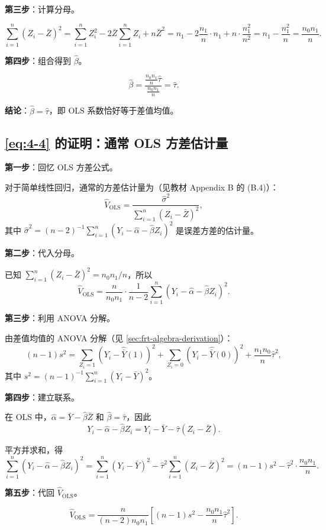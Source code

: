 \textbf{第三步}：计算分母。

\[
\sum_{i=1}^n (Z_i - \bar{Z})^2 = \sum_{i=1}^n Z_i^2 - 2\bar{Z}\sum_{i=1}^n Z_i + n\bar{Z}^2 = n_1 - 2\frac{n_1}{n}\cdot n_1 + n\cdot\frac{n_1^2}{n^2} = n_1 - \frac{n_1^2}{n} = \frac{n_0 n_1}{n}.
\]

\textbf{第四步}：组合得到 $\hat{\beta}$。

\[
\hat{\beta} = \frac{\frac{n_0 n_1}{n}\hat{\tau}}{\frac{n_0 n_1}{n}} = \hat{\tau}.
\]

\textbf{结论}：$\hat{\beta} = \hat{\tau}$，即 OLS 系数恰好等于差值均值。

\subsection*{\eqref{eq:4-4} 的证明：通常 OLS 方差估计量}

\textbf{第一步}：回忆 OLS 方差公式。

对于简单线性回归，通常的方差估计量为（见教材 Appendix B 的 (B.4)）：
\[
\hat{V}_{\text{OLS}} = \frac{\hat{\sigma}^2}{\sum_{i=1}^n (Z_i - \bar{Z})^2},
\]
其中 $\hat{\sigma}^2 = (n-2)^{-1}\sum_{i=1}^n (Y_i - \hat{\alpha} - \hat{\beta} Z_i)^2$ 是误差方差的估计量。

\textbf{第二步}：代入分母。

已知 $\sum_{i=1}^n (Z_i - \bar{Z})^2 = n_0 n_1/n$，所以
\[
\hat{V}_{\text{OLS}} = \frac{n}{n_0 n_1}\cdot\frac{1}{n-2}\sum_{i=1}^n (Y_i - \hat{\alpha} - \hat{\beta} Z_i)^2.
\]

\textbf{第三步}：利用 ANOVA 分解。

由差值均值的 ANOVA 分解（见 \cref{sec:frt-algebra-derivation}）：
\[
(n-1)s^2 = \sum_{Z_i=1}(Y_i - \hat{\bar{Y}}(1))^2 + \sum_{Z_i=0}(Y_i - \hat{\bar{Y}}(0))^2 + \frac{n_1 n_0}{n}\hat{\tau}^2,
\]
其中 $s^2 = (n-1)^{-1}\sum_{i=1}^n(Y_i - \bar{Y})^2$。

\textbf{第四步}：建立联系。

在 OLS 中，$\hat{\alpha} = \bar{Y} - \hat{\beta}\bar{Z}$ 和 $\hat{\beta} = \hat{\tau}$，因此
\[
Y_i - \hat{\alpha} - \hat{\beta} Z_i = Y_i - \bar{Y} - \hat{\tau}(Z_i - \bar{Z}).
\]

平方并求和，得
\[
\sum_{i=1}^n (Y_i - \hat{\alpha} - \hat{\beta} Z_i)^2 = \sum_{i=1}^n (Y_i - \bar{Y})^2 - \hat{\tau}^2\sum_{i=1}^n (Z_i - \bar{Z})^2 = (n-1)s^2 - \hat{\tau}^2\cdot\frac{n_0 n_1}{n}.
\]

\textbf{第五步}：代回 $\hat{V}_{\text{OLS}}$。

\[
\hat{V}_{\text{OLS}} = \frac{n}{(n-2)n_0 n_1}\left[(n-1)s^2 - \frac{n_0 n_1}{n}\hat{\tau}^2\right].
\]

